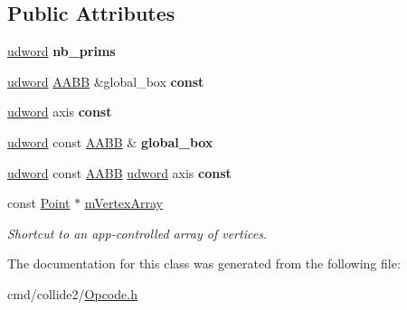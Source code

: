 \subsection*{Public Attributes}
\begin{DoxyCompactItemize}
\item 
\hyperlink{IceTypes_8h_a44c6f1920ba5551225fb534f9d1a1733}{udword} {\bfseries nb\+\_\+prims}\hypertarget{classOpcode_1_1AABBTreeOfVerticesBuilder_a09cf7412499a010a6d742e5f953c4b3f}{}\label{classOpcode_1_1AABBTreeOfVerticesBuilder_a09cf7412499a010a6d742e5f953c4b3f}

\item 
\hyperlink{IceTypes_8h_a44c6f1920ba5551225fb534f9d1a1733}{udword} \hyperlink{classOpcode_1_1AABB}{A\+A\+BB} \&global\+\_\+box {\bfseries const}\hypertarget{classOpcode_1_1AABBTreeOfVerticesBuilder_ad8bd7cac8b8ac23db7a3ef264f612c5a}{}\label{classOpcode_1_1AABBTreeOfVerticesBuilder_ad8bd7cac8b8ac23db7a3ef264f612c5a}

\item 
\hyperlink{IceTypes_8h_a44c6f1920ba5551225fb534f9d1a1733}{udword} axis {\bfseries const}\hypertarget{classOpcode_1_1AABBTreeOfVerticesBuilder_a7197a6ce337c5189ee25c4a533a4a4aa}{}\label{classOpcode_1_1AABBTreeOfVerticesBuilder_a7197a6ce337c5189ee25c4a533a4a4aa}

\item 
\hyperlink{IceTypes_8h_a44c6f1920ba5551225fb534f9d1a1733}{udword} const \hyperlink{classOpcode_1_1AABB}{A\+A\+BB} \& {\bfseries global\+\_\+box}\hypertarget{classOpcode_1_1AABBTreeOfVerticesBuilder_a19c5b61fb13fedb072b20be380c59112}{}\label{classOpcode_1_1AABBTreeOfVerticesBuilder_a19c5b61fb13fedb072b20be380c59112}

\item 
\hyperlink{IceTypes_8h_a44c6f1920ba5551225fb534f9d1a1733}{udword} const \hyperlink{classOpcode_1_1AABB}{A\+A\+BB} \hyperlink{IceTypes_8h_a44c6f1920ba5551225fb534f9d1a1733}{udword} axis {\bfseries const}\hypertarget{classOpcode_1_1AABBTreeOfVerticesBuilder_a9a58eaf6b543a1938e10f3eedf494e71}{}\label{classOpcode_1_1AABBTreeOfVerticesBuilder_a9a58eaf6b543a1938e10f3eedf494e71}

\item 
const \hyperlink{classOpcode_1_1Point}{Point} $\ast$ \hyperlink{classOpcode_1_1AABBTreeOfVerticesBuilder_a77ad2269d4c3029a6a8b5654c64ce1a3}{m\+Vertex\+Array}\hypertarget{classOpcode_1_1AABBTreeOfVerticesBuilder_a77ad2269d4c3029a6a8b5654c64ce1a3}{}\label{classOpcode_1_1AABBTreeOfVerticesBuilder_a77ad2269d4c3029a6a8b5654c64ce1a3}

\begin{DoxyCompactList}\small\item\em Shortcut to an app-\/controlled array of vertices. \end{DoxyCompactList}\end{DoxyCompactItemize}


The documentation for this class was generated from the following file\+:\begin{DoxyCompactItemize}
\item 
cmd/collide2/\hyperlink{Opcode_8h}{Opcode.\+h}\end{DoxyCompactItemize}
